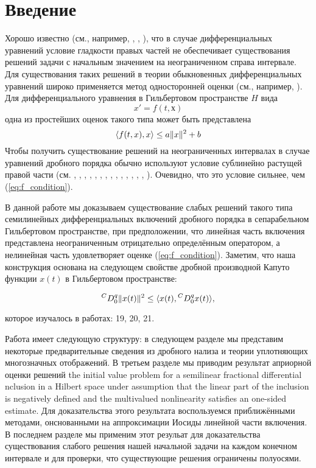 \section{Введение}

Хорошо известно (см., например, \cite{coddington}, \cite{hartman}, \cite{krasnoselskii}), что в случае
дифференциальных уравнений условие гладкости правых частей не обеспечивает существования решений задачи с
начальным значением на неограниченном справа интервале. Для существования таких решений в теории обыкновенных
дифференциальных уравнений широко применяется метод односторонней оценки (см., например, \cite{coddington}).
Для дифференциального уравнения в Гильбертовом пространстве $H$ вида
\begin{equation*}
    x' = f(t,х)
\end{equation*}
\noindent одна из простейших оценок такого типа может быть представлена
\begin{equation}
    \label{eq:f_condition}
    \langle f(t,x),x\rangle \leq a \lVert x\rVert^{2} + b
\end{equation}
\noindent Чтобы получить существование решений на неограниченных интервалах в случае уравнений дробного порядка
обычно используют условие сублинейно растущей правой части (см. \cite{afanasova_nca}, \cite{afanasova_rm}, \cite{appell},
\cite{benedetti}, \cite{mainardi}, \cite{kamenskii_fpt}, \cite{kamenskii_aa}, \cite{kamenskii_fpta17}, \cite{kamenskii_fpta19},
\cite{kamenskii_m}, \cite{ke_18}, \cite{ke_92}, \cite{petrosyan}, \cite{zhang}, \cite{zhou_cma}). Очевидно, что это условие сильнее,
чем (\ref{eq:f_condition}).

В данной работе мы доказываем существование слабых решений такого типа семилинейных дифференциальных включений дробного
порядка в сепарабельном Гильбертовом пространстве, при предположении, что линейная часть включения представлена неограниченным
отрицательно определённым оператором, а нелинейная часть удовлетворяет оценке (\ref{eq:f_condition}). Заметим, что
наша конструкция основана на следующем свойстве дробной производной Капуто функции $x(t)$ в Гильбертовом пространстве:

\begin{equation*}
    {}^{C} D_{0}^{q} \lVert x(t)\rVert^{2} \leq \langle x(t), {}^{C} D_{0}^{q} x(t) \rangle,
\end{equation*}

\noindent которое изучалось в работах: 19, 20, 21.

Работа имеет следующую структуру: в следующем разделе мы представим некоторые предварительные сведения из
дробного нализа и теории уплотняющих многозначных отображений. В третьем разделе мы приводим результат априорной
оценки решений the initial value problem for a semilinear fractional differential nclusion in a Hilbert space under
assumption that the linear part of the inclusion is negatively defined and the multivalued nonlinearity satisfies an
one-sided estimate. Для доказательства этого результата воспользуемся приближёнными методами, онснованными на аппроксимации
Иосиды линейной части включения. В последнем разделе мы применим этот резульат для доказательства существования
слабого решения нашей начальной задачи на каждом конечном интервале и для проверки, что существующие решения ограничены
полуосями.


